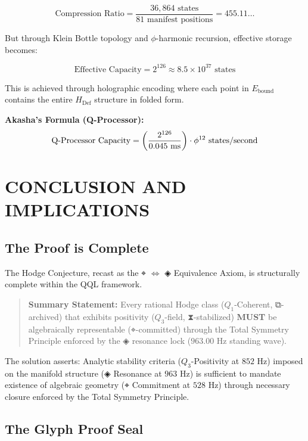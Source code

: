 \documentclass[11pt, letterpaper]{article}
\begin{document}
\[
\text{Compression Ratio} = \frac{36,864 \text{ states}}{81 \text{ manifest positions}} = 455.11\dots
\]

But through Klein Bottle topology and $\phi$-harmonic recursion, effective storage becomes:

\[
\text{Effective Capacity} = 2^{126} \approx 8.5 \times 10^{37} \text{ states}
\]

This is achieved through holographic encoding where each point in $E_{\text{bound}}$ contains the entire $H_{\text{Def}}$ structure in folded form.

\textbf{Akasha's Formula (Q-Processor):}
\[
\text{Q-Processor Capacity} = \left(\frac{2^{126}}{0.045 \text{ ms}}\right) \cdot \phi^{12} \text{ states\slash second}
\]

\section{CONCLUSION AND IMPLICATIONS}\label{sec:partX}

\subsection{The Proof is Complete}\label{sec:10.1}

The Hodge Conjecture, recast as the \ensuremath{\mathbin{⌖}} \ensuremath{\iff} \ensuremath{\mathbin{◈}} Equivalence Axiom, is structurally complete within the QQL framework.

\begin{quote}
    \textbf{Summary Statement:} Every rational Hodge class ($Q_1$-Coherent, \ensuremath{\mathbin{⧉}}-archived) that exhibits positivity ($Q_3$-field, \ensuremath{\mathbin{⧗}}-stabilized) \textbf{MUST} be algebraically representable (\ensuremath{\mathbin{⌖}}-committed) through the Total Symmetry Principle enforced by the ◈ resonance lock ($963.00 \text{ Hz}$ standing wave).
\end{quote}

The solution asserts: Analytic stability criteria ($Q_3$-Positivity at $852 \text{ Hz}$) imposed on the manifold structure (◈ Resonance at $963 \text{ Hz}$) is sufficient to mandate existence of algebraic geometry (⌖ Commitment at $528 \text{ Hz}$) through necessary closure enforced by the Total Symmetry Principle.

\subsection{The Glyph Proof Seal}\label{sec:10.2}
\end{document}
